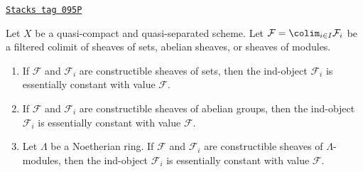 \begin{lemma}
\label{etale-cohomology-lemma-colimit-constructible}
\href{https://stacks.math.columbia.edu/tag/095P}{\texttt{Stacks tag 095P}}

Let $X$ be a quasi-compact and quasi-separated scheme. Let
$\mathcal{F} = \colim_{i \in I} \mathcal{F}_i$ be a filtered
colimit of sheaves of sets, abelian sheaves, or sheaves of modules.
\begin{enumerate}
\item If $\mathcal{F}$ and $\mathcal{F}_i$ are constructible sheaves of
sets, then the ind-object $\mathcal{F}_i$ is essentially constant with
value $\mathcal{F}$.
\item If $\mathcal{F}$ and $\mathcal{F}_i$ are constructible sheaves of
abelian groups, then the ind-object $\mathcal{F}_i$ is essentially constant
with value $\mathcal{F}$.
\item Let $\Lambda$ be a Noetherian ring.
If $\mathcal{F}$ and $\mathcal{F}_i$ are constructible sheaves of
$\Lambda$-modules, then the ind-object $\mathcal{F}_i$ is essentially constant
with value $\mathcal{F}$.
\end{enumerate}
\end{lemma}

